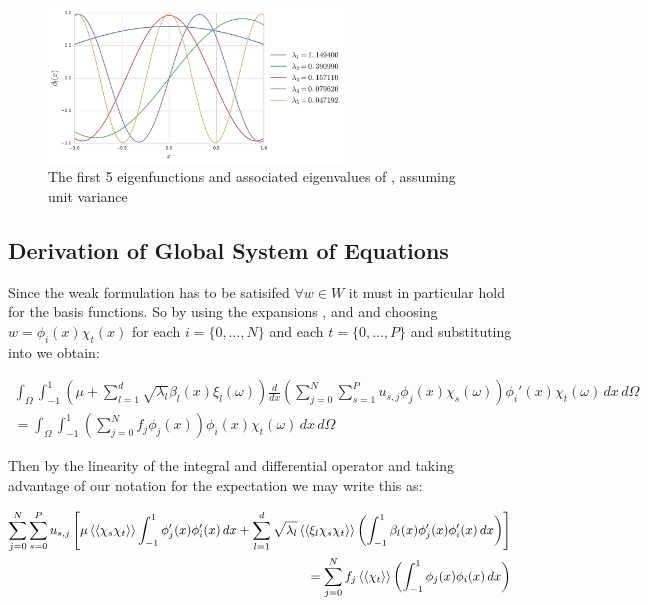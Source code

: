 \begin{figure}
    \centering
    \includegraphics[width=0.7\textwidth]{img/kle-eigenfunctions.pdf}
    \caption{The first 5 eigenfunctions and associated eigenvalues of
             , assuming unit
             variance}
    \label{fig:kle-eigenfunctions}
\end{figure}

\subsection{Derivation of Global System of Equations}

Since the weak formulation  has to be satisifed
$\forall w \in W$ it must in particular hold for the basis functions. So by
using the expansions ,
 and  and
choosing $w = \phi_i(x)\chi_t(x)$ for each $i = \{0,\ldots,N\}$ and each $t =
\{0,\ldots,P\}$ and substituting into  we
obtain:

\begin{align*}
    \int_{\Omega}\int_{-1}^1
      \left(\mu + \sum_{l=1}^d\sqrt{\lambda_l}\beta_l(x)\xi_l(\omega)\right)
      \frac{d}{dx}\left(\sum_{j=0}^N\sum_{s=1}^Pu_{s,j}\phi_j(x)\chi_s(\omega)\right)
      \phi_i'(x)\chi_t(\omega)\, dx\, d\Omega \\ =
    \int_{\Omega}\int_{-1}^1
      \left(\sum_{j=0}^Nf_j\phi_j(x)\right)
      \phi_i(x)\chi_t(\omega)\, dx\, d\Omega
\end{align*}

Then by the linearity of the integral and differential operator and taking
advantage of our notation for the expectation
 we may write this as:

\begin{align}\label{eq:oned-stochastic-discrete}
  \begin{split}
      \sum_{j=0}^N\sum_{s=0}^Pu_{s,j}\left[
          \mu\left\langle\langle\chi_s\chi_t\right\rangle\rangle
          \int_{-1}^1\phi_j'(x)\phi_i'(x)\, dx +
          \sum_{l=1}^d\sqrt{\lambda_l}\left\langle\langle\xi_l\chi_s\chi_t\right\rangle\rangle
          \left(\int_{-1}^1 \beta_l(x)\phi_j'(x)\phi_i'(x)\, dx\right)
      \right]\\ =
      \sum_{j=0}^Nf_j\left\langle\langle\chi_t\right\rangle\rangle
          \left(\int_{-1}^1\phi_j(x)\phi_i(x)\, dx\right)
  \end{split}
\end{align}

